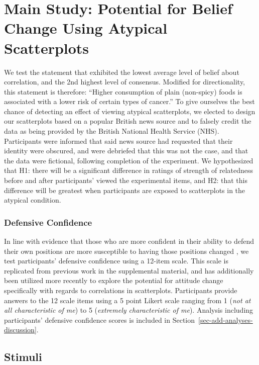 \documentclass[manuscript,screen,review]{acmart}
\begin{document}
\section{Main Study: Potential for Belief Change Using Atypical
Scatterplots}\label{sec-main-study}

We test the statement that exhibited the lowest average level of belief
about correlation, and the 2nd highest level of consensus. Modified for
directionality, this statement is therefore: ``Higher consumption of
plain (non-spicy) foods is associated with a lower risk of certain types
of cancer.'' To give ourselves the best chance of detecting an effect of
viewing atypical scatterplots, we elected to design our scatterplots
based on a popular British news source and to falsely credit the data as
being provided by the British National Health Service (NHS).
Participants were informed that said news source had requested that
their identity were obscured, and were debriefed that this was not the
case, and that the data were fictional, following completion of the
experiment. We hypothesized that H1: there will be a significant
difference in ratings of strength of relatedness before and after
participants' viewed the experimental items, and H2: that this
difference will be greatest when participants are exposed to
scatterplots in the atypical condition.

\subsubsection{Defensive Confidence}\label{sec-def-con}

In line with evidence that those who are more confident in their ability
to defend their own positions are more susceptible to having those
positions changed \citep{albarracin_2004}, we test participants'
defensive confidence using a 12-item scale. This scale is replicated
from previous work in the supplemental material, and has additionally
been utilized more recently \citep{markant_2023} to explore the
potential for attitude change specifically with regards to correlations
in scatterplots. Participants provide answers to the 12 scale items
using a 5 point Likert scale ranging from 1 (\emph{not at all
characteristic of me}) to 5 (\emph{extremely characteristic of me}).
Analysis including participants' defensive confidence scores is included
in Section~\ref{sec-add-analyses-discussion}.

\subsection{Stimuli}\label{sec-stimuli-main}
\end{document}
